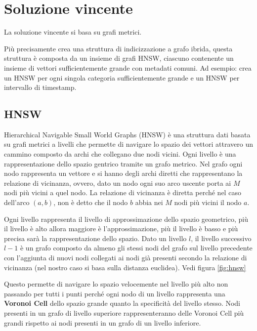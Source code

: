 \chapter{Soluzione vincente}
La soluzione vincente si basa su grafi metrici.

Più precisamente crea una struttura di indicizzazione a grafo ibrida, questa struttura 
è composta da un insieme di grafi HNSW, ciascuno contenente un insieme di vettori 
sufficientemente grande con metadati comuni. Ad esempio: crea un HNSW per ogni singola 
categoria sufficientemente grande e un HNSW per intervallo di timestamp.

\section{HNSW}
Hierarchical Navigable Small World Graphs (HNSW) è una struttura dati basata su 
grafi metrici a livelli che permette di navigare
lo spazio dei vettori attravero un cammino composto da archi che collegano due nodi 
vicini. Ogni livello è una 
rappresentazione dello spazio gentrico tramite un grafo metrico. Nel grafo ogni nodo rappresenta 
un vettore e si hanno degli archi diretti che rappresentano la relazione di vicinanza,
ovvero, dato un nodo ogni suo arco uscente porta ai $M$ nodi più vicini a quel nodo. La relazione 
di vicinanza è diretta perché nel caso dell'arco $(a,b)$, non è detto che il nodo 
$b$ abbia nei $M$ nodi più vicini il nodo $a$.

Ogni livello rappresenta il livello di approssimazione dello spazio geometrico, 
più il livello è alto allora maggiore è l'approssimazione, più il livello è basso 
e più precisa sarà la rappresentazione dello spazio. Dato un livello $l$, il livello 
successivo $l-1$ è un grafo composto da almeno gli stessi nodi del grafo sul livello 
precedente con l'aggiunta di nuovi nodi collegati ai nodi già presenti secondo 
la relazione di vicinanza (nel nostro caso si basa sulla distanza euclidea). Vedi 
figura \ref{fig:hnsw} 

Questo permette di navigare lo spazio velocemente nel livello più alto non passando 
per tutti i punti perché ogni nodo di un livello rappresenta una \textbf{Voronoi Cell} dello spazio grande 
quanto la specificità del livello stesso. Nodi presenti in un grafo di livello 
superiore rappresenteranno delle Voronoi Cell più grandi rispetto ai nodi 
presenti in un grafo di un livello inferiore.

